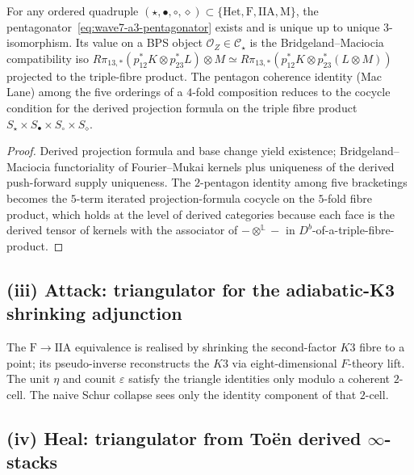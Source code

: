 \begin{theorem}
\label{thm:wave7-a3-coherent-pentagonator}
\ClaimStatusTheorem
For any ordered quadruple
$(\star, \bullet, \circ, \diamond) \subset
\{\mathrm{Het}, \mathrm{F}, \mathrm{IIA}, \mathrm{M}\}$,
the pentagonator~\eqref{eq:wave7-a3-pentagonator} exists and is
unique up to unique $3$-isomorphism. Its value on a BPS object
$\mathcal{O}_Z \in \mathcal{C}_\star$ is the Bridgeland--Maciocia
compatibility iso
$R\pi_{13,*}(p_{12}^* K \otimes p_{23}^* L) \otimes M
\simeq R\pi_{13,*}(p_{12}^* K \otimes p_{23}^*(L \otimes M))$
projected to the triple-fibre product. The pentagon coherence
identity (Mac Lane) among the five orderings of a $4$-fold
composition reduces to the cocycle condition for the derived
projection formula on the triple fibre product
$S_\star \times S_\bullet \times S_\circ \times S_\diamond$.
\end{theorem}

\begin{proof}
Derived projection formula and base change yield existence;
Bridgeland--Maciocia functoriality of Fourier--Mukai kernels
\cite{BridgelandMaciocia2002} plus uniqueness of the derived
push-forward supply uniqueness. The $2$-pentagon identity among
five bracketings becomes the $5$-term iterated projection-formula
cocycle on the $5$-fold fibre product, which holds at the level
of derived categories because each face is the derived tensor of
kernels with the associator of $- \otimes^{\mathbb{L}} -$ in
$D^b$-of-a-triple-fibre-product.
\end{proof}

\subsection*{(iii) Attack: triangulator for the adiabatic-K3
shrinking adjunction}

The $\mathrm{F}\to\mathrm{IIA}$ equivalence is realised by shrinking
the second-factor $K3$ fibre to a point; its pseudo-inverse
reconstructs the $K3$ via eight-dimensional $F$-theory lift. The
unit $\eta$ and counit $\varepsilon$ satisfy the triangle identities
only modulo a coherent $2$-cell. The naive Schur collapse sees only
the identity component of that $2$-cell.

\subsection*{(iv) Heal: triangulator from Toën derived $\infty$-stacks}

